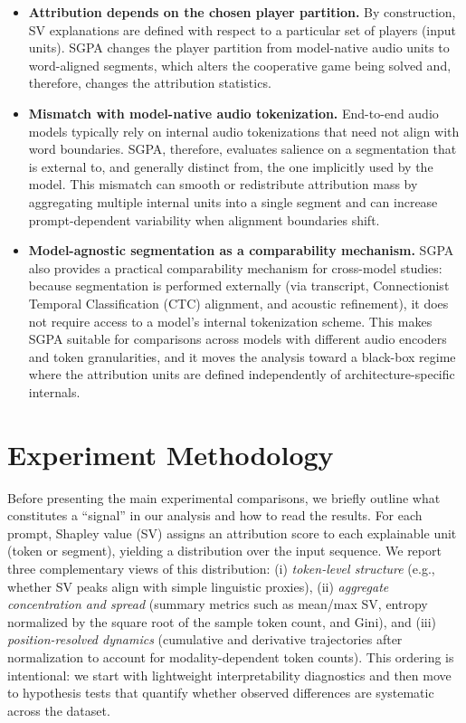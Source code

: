 \begin{itemize}
    \item \textbf{Attribution depends on the chosen player partition.}
By construction, SV explanations are defined with respect to a particular set of players (input units). SGPA changes the player partition from model-native audio units to word-aligned segments, which alters the cooperative game being solved and, therefore, changes the attribution statistics.

    \item \textbf{Mismatch with model-native audio tokenization.}
End-to-end audio models typically rely on internal audio tokenizations that need not align with word boundaries. SGPA, therefore, evaluates salience on a segmentation that is external to, and generally distinct from, the one implicitly used by the model. This mismatch can smooth or redistribute attribution mass by aggregating multiple internal units into a single segment and can increase prompt-dependent variability when alignment boundaries shift.

    \item \textbf{Model-agnostic segmentation as a comparability mechanism.}
SGPA also provides a practical comparability mechanism for cross-model studies: because segmentation is performed externally (via transcript, Connectionist Temporal Classification (CTC) alignment, and acoustic refinement), it does not require access to a model's internal tokenization scheme. This makes SGPA suitable for comparisons across models with different audio encoders and token granularities, and it moves the analysis toward a black-box regime where the attribution units are defined independently of architecture-specific internals.
\end{itemize}

\chapter{Experiment Methodology}
\label{sec:experiments__methodology}

Before presenting the main experimental comparisons, we briefly outline what constitutes a ``signal'' in our analysis and how to read the results.
For each prompt, Shapley value (SV) assigns an attribution score to each explainable unit (token or segment), yielding a distribution over the input sequence.
We report three complementary views of this distribution: (i) \emph{token-level structure} (e.g., whether SV peaks align with simple linguistic proxies),
(ii) \emph{aggregate concentration and spread} (summary metrics such as mean/max SV, entropy normalized by the square root of the sample token count, and Gini), and
(iii) \emph{position-resolved dynamics} (cumulative and derivative trajectories after normalization to account for modality-dependent token counts).
This ordering is intentional: we start with lightweight interpretability diagnostics and then move to hypothesis tests that quantify whether observed differences are systematic across the dataset.

